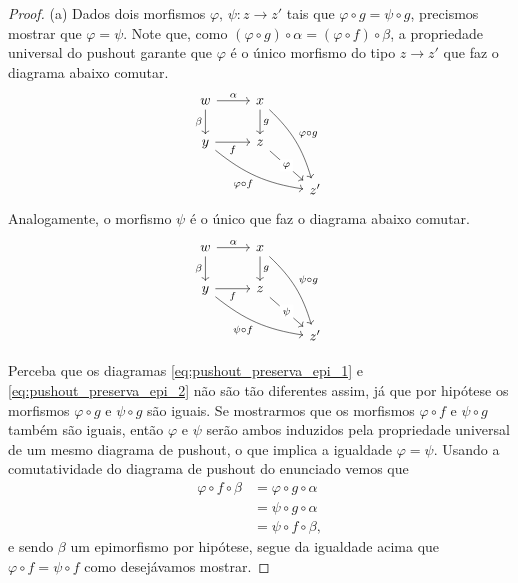 \begin{proof}
    (a) Dados dois morfismos $\varphi,\, \psi: z \to z'$ tais que $\varphi \circ g = \psi \circ g$, precismos mostrar que $\varphi = \psi$.
    Note que, como $(\varphi \circ g) \circ \alpha = (\varphi \circ f) \circ \beta$, a propriedade universal do pushout garante que $\varphi$ é o único morfismo do tipo $z \to z'$ que faz o diagrama abaixo comutar.
    \begin{equation}\label{eq:pushout_preserva_epi_1}
        \begin{tikzcd}
            w
            \arrow[r, "\alpha"]
            \arrow[d, "\beta" swap]
            & x
            \arrow[d, "g"]
            \arrow[rdd, bend left=15, "\varphi \circ g"]
            \\ y
            \arrow[r, "f" swap]
            \arrow[rrd, bend right=15, "\varphi \circ f" swap]
            & z
            \arrow[rd, "\varphi" description]
            \\ & & z'
        \end{tikzcd}
    \end{equation}
    Analogamente, o morfismo $\psi$ é o único que faz o diagrama abaixo comutar.
    \begin{equation}\label{eq:pushout_preserva_epi_2}
        \begin{tikzcd}
            w
            \arrow[r, "\alpha"]
            \arrow[d, "\beta" swap]
            & x
            \arrow[d, "g"]
            \arrow[rdd, bend left=15, "\psi \circ g"]
            \\ y
            \arrow[r, "f" swap]
            \arrow[rrd, bend right=15, "\psi \circ f" swap]
            & z
            \arrow[rd, "\psi" description]
            \\ & & z'
        \end{tikzcd}
    \end{equation}

    Perceba que os diagramas \eqref{eq:pushout_preserva_epi_1} e \eqref{eq:pushout_preserva_epi_2} não são tão diferentes assim, já que por hipótese os morfismos $\varphi \circ g$ e $\psi \circ g$ são iguais.
    Se mostrarmos que os morfismos $\varphi \circ f$ e $\psi \circ g$ também são iguais, então $\varphi$ e $\psi$ serão ambos induzidos pela propriedade universal de um mesmo diagrama de pushout, o que implica a igualdade $\varphi = \psi$.
    Usando a comutatividade do diagrama de pushout do enunciado vemos que
    \begin{align*}
        \varphi \circ f \circ \beta
        & = \varphi \circ g \circ \alpha \\
        & = \psi \circ g \circ \alpha \\
        & = \psi \circ f \circ \beta,
    \end{align*}
    e sendo $\beta$ um epimorfismo por hipótese, segue da igualdade acima que $\varphi \circ f = \psi \circ f$ como desejávamos mostrar.


\end{proof}
